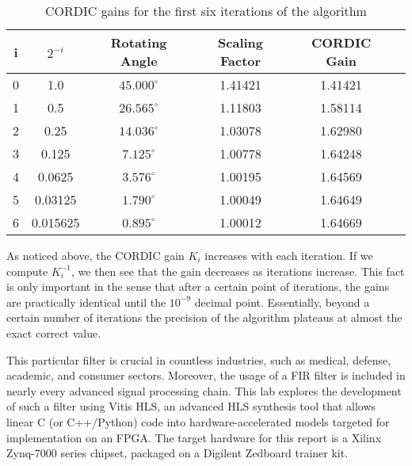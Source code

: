 \documentclass[11pt]{report}
\begin{document}
\begin{table}
\begin{center}
\begin{tabular}{|c|c|c|c|c|c|}
\hline
i & $2^{-i}$ 	& Rotating Angle  	& Scaling Factor 	& CORDIC Gain 	\\ \hline \hline
0 & 1.0 		& $45.000^{\circ}$	& 1.41421			& 1.41421		\\ \hline
1 & 0.5 		& $26.565^{\circ}$	& 1.11803			& 1.58114		\\ \hline
2 & 0.25 		& $14.036^{\circ}$	& 1.03078			& 1.62980		\\ \hline
3 & 0.125 		& $7.125^{\circ}$	& 1.00778			& 1.64248		\\ \hline
4 & 0.0625 	& $3.576^{\circ}$	& 1.00195			& 1.64569		\\ \hline
5 & 0.03125 	& $1.790^{\circ}$	& 1.00049			& 1.64649		\\ \hline
6 & 0.015625 	& $0.895^{\circ}$	& 1.00012			& 1.64669		\\ \hline
\end{tabular}
\end{center}
\caption{CORDIC gains for the first six iterations of the algorithm}
\label{table:cordic}
\end{table}
\FloatBarrier

As noticed above, the CORDIC gain $K_i$ increases with each iteration. If we compute $K_i ^{-1}$, we then see that the gain decreases as iterations increase. This fact is only important in the sense that after a certain point of iterations, the gains are practically identical until the $10^{-9}$ decimal point. Essentially, beyond a certain number of iterations the precision of the algorithm plateaus at almost the exact correct value.

This particular filter is crucial in countless industries, such as medical, defense, academic, and consumer sectors. Moreover, the usage of a \ac{FIR} filter is included in nearly every advanced signal processing chain. This lab explores the development of such a filter using Vitis HLS, an advanced \ac{HLS} synthesis tool that allows linear C (or C++/Python) code into hardware-accelerated models targeted for implementation on an \ac{FPGA}. The target hardware for this report is a Xilinx Zynq-7000 series chipset, packaged on a Digilent Zedboard trainer kit.
\end{document}
